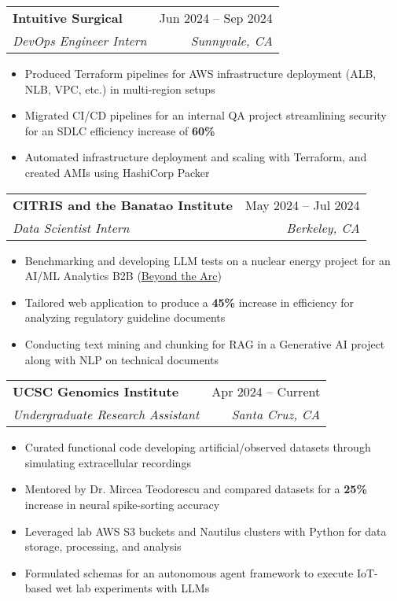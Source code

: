 \documentclass[letterpaper,11pt]{article}
\makeatletter
\newcommand{\resumeItem}[1]{
  \item\small{
    {#1 \vspace{-2pt}}
  }
}
\newcommand{\resumeSubheading}[4]{
  \vspace{-2pt}\item
    \begin{tabular*}{0.97\textwidth}[t]{l@{\extracolsep{\fill}}r}
      \textbf{#1} & #2 \\
      \textit{\small#3} & \textit{\small #4} \\
    \end{tabular*}\vspace{-7pt}
}
\newcommand{\resumeItemListStart}{\begin{itemize}}
\newcommand{\resumeItemListEnd}{\end{itemize}\vspace{-5pt}}
\makeatother
\begin{document}
\resumeSubheading
{Intuitive Surgical}{Jun 2024 -- Sep 2024}
{DevOps Engineer Intern}{Sunnyvale, CA}
\resumeItemListStart
\resumeItem{Produced Terraform pipelines for AWS infrastructure deployment (ALB, NLB, VPC, etc.) in multi-region setups}
\resumeItem{Migrated CI/CD pipelines for an internal QA project streamlining security for an SDLC efficiency increase of \textbf{60\%}}
\resumeItem{Automated infrastructure deployment and scaling with Terraform, and created AMIs using HashiCorp Packer}
\resumeItemListEnd

\resumeSubheading
{CITRIS and the Banatao Institute}{May 2024 -- Jul 2024}
{Data Scientist Intern}{Berkeley, CA}
\resumeItemListStart
\resumeItem{Benchmarking and developing LLM tests on a nuclear energy project for an AI/ML Analytics B2B (\color[HTML]{0000EE}\href{https://beyondthearc.com}{Beyond the Arc})}
\resumeItem{Tailored web application to produce a \textbf{45\%} increase in efficiency for analyzing regulatory guideline documents}
\resumeItem{Conducting text mining and chunking for RAG in a Generative AI project along with NLP on technical documents}
\resumeItemListEnd

\resumeSubheading
{UCSC Genomics Institute}{Apr 2024 -- Current}
{Undergraduate Research Assistant}{Santa Cruz, CA}
\resumeItemListStart
\resumeItem{Curated functional code developing artificial/observed datasets through simulating extracellular recordings}
\resumeItem{Mentored by Dr. Mircea Teodorescu and compared datasets for a {\textbf{25\%}} increase in neural spike-sorting accuracy}
\resumeItem{Leveraged lab AWS S3 buckets and Nautilus clusters with Python for data storage, processing, and analysis}
\resumeItem{Formulated schemas for an autonomous agent framework to execute IoT-based wet lab experiments with LLMs}
\resumeItemListEnd


\end{document}
